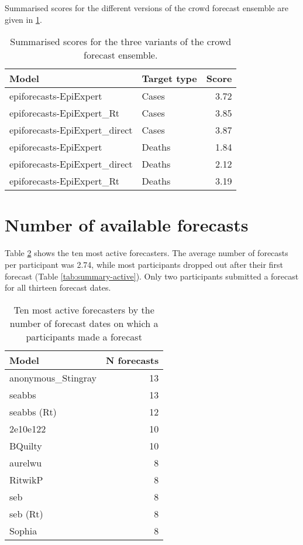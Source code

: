 \documentclass[
]{article}
\begin{document}
Summarised scores for the different versions of the crowd forecast ensemble are given in \ref{tab:scores-ensemble-variants}.

\begin{table}

\caption{\label{tab:scores-ensemble-variants}Summarised scores for the three variants of the crowd forecast ensemble.}
\centering
\begin{tabular}[t]{l|l|r}
\hline
Model & Target type & Score\\
\hline
epiforecasts-EpiExpert & Cases & 3.72\\
\hline
epiforecasts-EpiExpert\_Rt & Cases & 3.85\\
\hline
epiforecasts-EpiExpert\_direct & Cases & 3.87\\
\hline
epiforecasts-EpiExpert & Deaths & 1.84\\
\hline
epiforecasts-EpiExpert\_direct & Deaths & 2.12\\
\hline
epiforecasts-EpiExpert\_Rt & Deaths & 3.19\\
\hline
\end{tabular}
\end{table}

\hypertarget{number-of-available-forecasts}{%
\section{Number of available forecasts}\label{number-of-available-forecasts}}

Table \ref{tab:top-active} shows the ten most active forecasters. The average number of forecasts per participant was 2.74, while most participants dropped out after their first forecast (Table \ref{tab:summary-active}). Only two participants submitted a forecast for all thirteen forecast dates.

\begin{table}

\caption{\label{tab:top-active}Ten most active forecasters by the number of forecast dates on which a participants made a forecast}
\centering
\begin{tabular}[t]{l|r}
\hline
Model & N forecasts\\
\hline
anonymous\_Stingray & 13\\
\hline
seabbs & 13\\
\hline
seabbs (Rt) & 12\\
\hline
2e10e122 & 10\\
\hline
BQuilty & 10\\
\hline
aurelwu & 8\\
\hline
RitwikP & 8\\
\hline
seb & 8\\
\hline
seb (Rt) & 8\\
\hline
Sophia & 8\\
\hline
\end{tabular}
\end{table}
\end{document}
